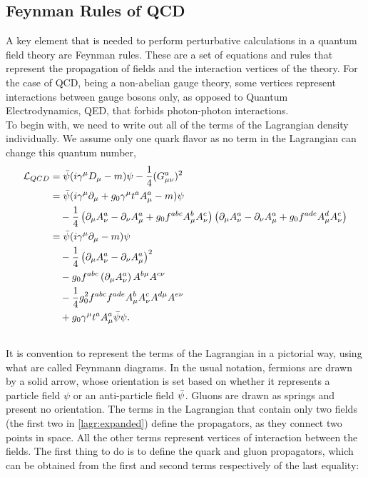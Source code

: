 \subsection{Feynman Rules of QCD}
A key element that is needed to perform perturbative calculations in a quantum field theory are Feynman rules. These are a set of equations and rules that represent the propagation of fields and the interaction vertices of the theory. For the case of QCD, being a non-abelian gauge theory, some vertices represent interactions between gauge bosons only, as opposed to Quantum Electrodynamics, QED, that forbids photon-photon interactions. \\
To begin with, we need to write out all of the terms of the Lagrangian density individually. We assume only one quark flavor as no term in the Lagrangian can change this quantum number,
\begin{align}\nonumber
    \mathcal{L}_{QCD} &= \bar{\psi}(i\gamma^\mu D_\mu - m)\psi -\frac{1}{4}(G_{\mu\nu}^a)^2 \\
    &= \bar{\psi}(i\gamma^\mu \partial_\mu  + g_0\gamma^\mu t^aA_\mu^a - m)\psi \\\nonumber
    &~~~-\frac{1}{4}\left( \partial_\mu A_\nu^a - \partial_\nu A_\mu^a + g_0f^{abc}A_\mu^b A_\nu^c \right) \left(\partial_\mu A_\nu^a - \partial_\nu A_\mu^a + g_0f^{ade}A_\mu^d A_\nu^e \right) \\\nonumber
    &= \bar{\psi}(i\gamma^\mu\partial_\mu - m)\psi \label{lagr:expanded} \\
    &~~~-\frac{1}{4}\left(\partial_\mu A_\nu^a - \partial_\nu A_\mu^a\right)^2 \\\nonumber
    &~~~- g_0f^{abc}\left(\partial_\mu A^a_\nu \right) A^{b\mu} A^{c\nu} \\\nonumber
    &~~~-\frac{1}{4}g_0^2f^{abc}f^{ade}A_\mu^bA_\nu^cA^{d\mu}A^{e\nu}  \\\nonumber
    &~~~+g_0\gamma^\mu t^a A_\mu^a \bar{\psi}\psi. \\\nonumber
\end{align}
It is convention to represent the terms of the Lagrangian in a pictorial way, using what are called Feynmann diagrams. In the usual notation, fermions are drawn by a solid arrow, whose orientation is set based on whether it represents a particle field $\psi$ or an anti-particle field $\bar{\psi}$. Gluons are drawn as springs and present no orientation. The terms in the Lagrangian that contain only two fields (the first two in \cref{lagr:expanded}) define the propagators, as they connect two points in space. All the other terms represent vertices of interaction between the fields.
The first thing to do is to define the quark and gluon propagators, which can be obtained from the first and second terms respectively of the last equality:

